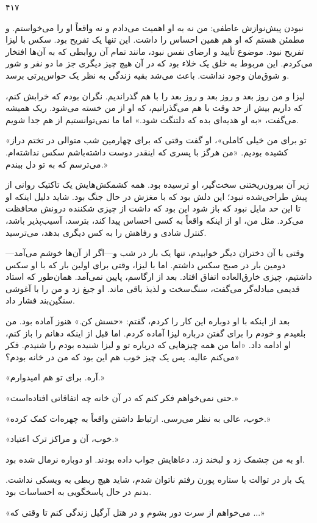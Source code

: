 ۴۱۷

نبودن پیش‌نوازش عاطفی: من نه به او اهمیت می‌دادم و نه واقعاً او را می‌خواستم. و مطمئن هستم که او هم همین احساس را داشت. این تنها یک تفریح بود. سکس با لیزا تفریح نبود. موضوع تأیید و ارضای نفس نبود، مانند تمام آن روابطی که به آن‌ها افتخار می‌کردم. این مربوط به خلق یک خلاء بود که در آن هیچ چیز دیگری جز ما دو نفر و شور و شوق‌مان وجود نداشت. باعث می‌شد بقیه زندگی به نظر یک حواس‌پرتی برسد.

لیزا و من روز بعد و روز بعد و روز بعد را با هم گذراندیم. نگران بودم که خرابش کنم، که داریم بیش از حد وقت با هم می‌گذرانیم، که او از من خسته می‌شود. ریک همیشه می‌گفت، «به او هدیه‌ای بده که دلتنگت شود.» اما ما نمی‌توانستیم از هم جدا شویم.

«تو برای من خیلی کاملی»، او گفت وقتی که برای چهارمین شب متوالی در تختم دراز کشیده بودیم. «من هرگز با پسری که اینقدر دوست داشته‌باشم سکس نداشته‌ام. می‌ترسم که به تو دل ببندم.»

زیر آن بیرون‌ریختنی سخت‌گیر، او ترسیده بود. همه کشمکش‌هایش یک تاکتیک روانی از پیش طراحی‌شده نبود؛ این دلش بود که با مغزش در حال جنگ بود. شاید دلیل اینکه او تا این حد مایل نبود که باز شود این بود که داشت از چیزی شکننده درونش محافظت می‌کرد. مثل من، او از اینکه واقعاً به کسی احساس پیدا کند، بترسد، آسیب‌پذیر باشد، کنترل شادی و رفاهش را به کس دیگری بدهد، می‌ترسید.

وقتی با آن دختران دیگر خوابیدم، تنها یک بار در شب و—اگر از آن‌ها خوشم می‌آمد—دومین بار در صبح سکس داشتم. اما با لیزا، وقتی برای اولین بار که با او سکس داشتیم، چیزی خارق‌العاده اتفاق افتاد. بعد از ارگاسم، پایین نمی‌آمد. همان‌طور که استاد قدیمی مبادله‌گر می‌گفت، سنگ‌سخت و لذیذ باقی ماند. او جیغ زد و من را با آغوشی سنگین‌بند فشار داد.

بعد از اینکه با او دوباره این کار را کردم، گفتم: «حسش کن.» هنوز آماده بود. من بلعیدم و خودم را برای گفتن درباره لیزا آماده کردم. اما قبل از اینکه دهانم را باز کنم، او ادامه داد. «اما من همه چیزهایی که درباره تو و لیزا شنیده بودم را شنیدم. فکر می‌کنم عالیه. پس یک چیز خوب هم این بود که من در خانه بودم؟»

«آره. برای تو هم امیدوارم.»

«حتی نمی‌خواهم فکر کنم که در آن خانه چه اتفاقاتی افتاده‌است.»

«خوب، عالی به نظر می‌رسی. ارتباط داشتن واقعاً به چهره‌ات کمک کرده.»

«خوب، آن و مراکز ترک اعتیاد.»

او به من چشمک زد و لبخند زد. دعاهایش جواب داده بودند. او دوباره نرمال شده بود.

یک بار در توالت با ستاره پورن رفتم ناتوان شدم، شاید هیچ ربطی به ویسکی نداشت. بدنم در حال پاسخگویی به احساسات بود.

«می‌خواهم از سرت دور بشوم و در هتل آرگیل زندگی کنم تا وقتی که ...»